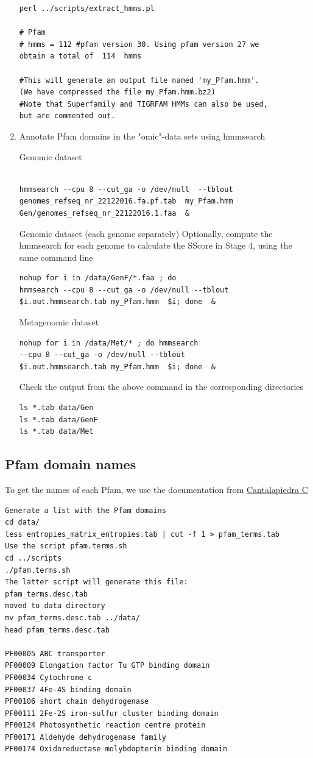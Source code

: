 \documentclass[12pt]{report}
\begin{document}
\begin{enumerate}
\begin{verbatim}
perl ../scripts/extract_hmms.pl 

# Pfam
# hmms = 112 #pfam version 30. Using pfam version 27 we 
obtain a total of  114  hmms  

#This will generate an output file named 'my_Pfam.hmm'. 
(We have compressed the file my_Pfam.hmm.bz2) 
#Note that Superfamily and TIGRFAM HMMs can also be used, 
but are commented out.

\end{verbatim}

\item Annotate Pfam domains in the "omic"-data sets using hmmsearch 

Genomic dataset 
\begin{verbatim}

hmmsearch --cpu 8 --cut_ga -o /dev/null  --tblout 
genomes_refseq_nr_22122016.fa.pf.tab  my_Pfam.hmm 
Gen/genomes_refseq_nr_22122016.1.faa  & 
\end{verbatim}

Genomic dataset (each genome separately) 
Optionally, compute the hmmsearch for each genome to calculate the SScore in
Stage 4, using the same command line  
\begin{verbatim}
nohup for i in /data/GenF/*.faa ; do 
hmmsearch --cpu 8 --cut_ga -o /dev/null --tblout 
$i.out.hmmsearch.tab my_Pfam.hmm  $i; done  & 
\end{verbatim}

Metagenomic dataset  
\begin{verbatim}
nohup for i in /data/Met/* ; do hmmsearch 
--cpu 8 --cut_ga -o /dev/null --tblout 
$i.out.hmmsearch.tab my_Pfam.hmm  $i; done  &
\end{verbatim}

Check the output from the above command in the corresponding directories 

\begin{verbatim}
ls *.tab data/Gen 
ls *.tab data/GenF 
ls *.tab data/Met
\end{verbatim}
\end{enumerate}
\subsection{Pfam domain names}
To get the names of each Pfam, we use the documentation from
\href{https://github.com/Cantalapiedra/pfam_terms}{Cantalapiedra C} 

\begin{verbatim}
Generate a list with the Pfam domains 
cd data/
less entropies_matrix_entropies.tab | cut -f 1 > pfam_terms.tab
Use the script pfam.terms.sh 
cd ../scripts
./pfam.terms.sh 
The latter script will generate this file:
pfam_terms.desc.tab
moved to data directory 
mv pfam_terms.desc.tab ../data/
head pfam_terms.desc.tab 

PF00005	ABC transporter
PF00009	Elongation factor Tu GTP binding domain
PF00034	Cytochrome c
PF00037	4Fe-4S binding domain
PF00106	short chain dehydrogenase
PF00111	2Fe-2S iron-sulfur cluster binding domain
PF00124	Photosynthetic reaction centre protein
PF00171	Aldehyde dehydrogenase family
PF00174	Oxidoreductase molybdopterin binding domain
\end{verbatim}
\end{document}
